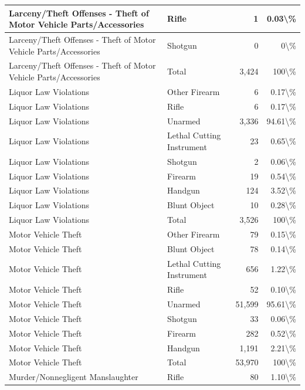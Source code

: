 \documentclass[
]{krantz}
\begin{document}
\begin{longtable}[t]{l|l|r|r}
\hline
Larceny/Theft Offenses - Theft of Motor Vehicle Parts/Accessories & Rifle & 1 & 0.03\textbackslash{}\%\\
\hline
Larceny/Theft Offenses - Theft of Motor Vehicle Parts/Accessories & Shotgun & 0 & 0\textbackslash{}\%\\
\hline
Larceny/Theft Offenses - Theft of Motor Vehicle Parts/Accessories & Total & 3,424 & 100\textbackslash{}\%\\
\hline
Liquor Law Violations & Other Firearm & 6 & 0.17\textbackslash{}\%\\
\hline
Liquor Law Violations & Rifle & 6 & 0.17\textbackslash{}\%\\
\hline
Liquor Law Violations & Unarmed & 3,336 & 94.61\textbackslash{}\%\\
\hline
Liquor Law Violations & Lethal Cutting Instrument & 23 & 0.65\textbackslash{}\%\\
\hline
Liquor Law Violations & Shotgun & 2 & 0.06\textbackslash{}\%\\
\hline
Liquor Law Violations & Firearm & 19 & 0.54\textbackslash{}\%\\
\hline
Liquor Law Violations & Handgun & 124 & 3.52\textbackslash{}\%\\
\hline
Liquor Law Violations & Blunt Object & 10 & 0.28\textbackslash{}\%\\
\hline
Liquor Law Violations & Total & 3,526 & 100\textbackslash{}\%\\
\hline
Motor Vehicle Theft & Other Firearm & 79 & 0.15\textbackslash{}\%\\
\hline
Motor Vehicle Theft & Blunt Object & 78 & 0.14\textbackslash{}\%\\
\hline
Motor Vehicle Theft & Lethal Cutting Instrument & 656 & 1.22\textbackslash{}\%\\
\hline
Motor Vehicle Theft & Rifle & 52 & 0.10\textbackslash{}\%\\
\hline
Motor Vehicle Theft & Unarmed & 51,599 & 95.61\textbackslash{}\%\\
\hline
Motor Vehicle Theft & Shotgun & 33 & 0.06\textbackslash{}\%\\
\hline
Motor Vehicle Theft & Firearm & 282 & 0.52\textbackslash{}\%\\
\hline
Motor Vehicle Theft & Handgun & 1,191 & 2.21\textbackslash{}\%\\
\hline
Motor Vehicle Theft & Total & 53,970 & 100\textbackslash{}\%\\
\hline
Murder/Nonnegligent Manslaughter & Rifle & 80 & 1.10\textbackslash{}\%\\

\end{longtable}
\end{document}
